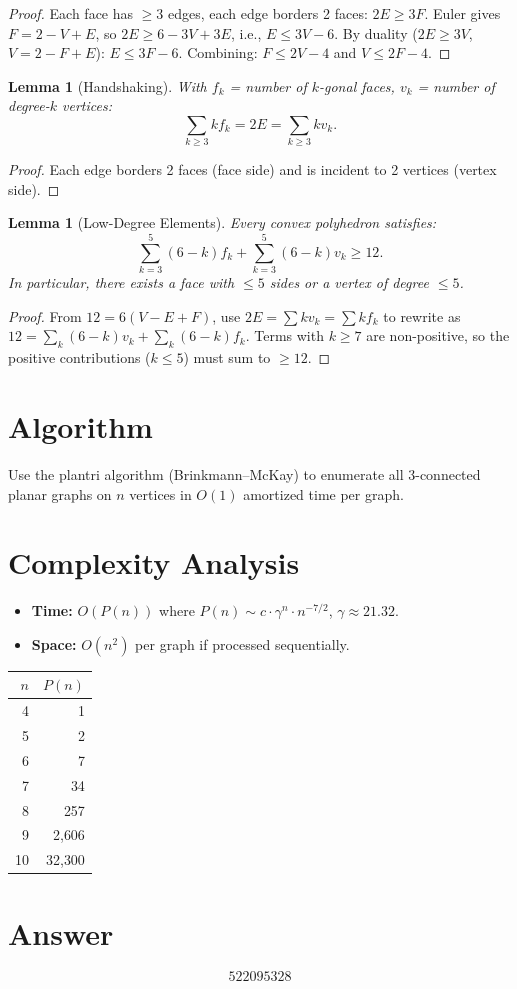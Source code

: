 \documentclass[11pt]{article}
\newtheorem{lemma}[theorem]{Lemma}
\begin{document}
\begin{proof}
Each face has $\ge 3$ edges, each edge borders 2 faces: $2E \ge 3F$. Euler gives $F = 2 - V + E$, so $2E \ge 6 - 3V + 3E$, i.e., $E \le 3V - 6$. By duality ($2E \ge 3V$, $V = 2 - F + E$): $E \le 3F - 6$. Combining: $F \le 2V-4$ and $V \le 2F-4$.
\end{proof}

\begin{lemma}[Handshaking]
With $f_k$ = number of $k$-gonal faces, $v_k$ = number of degree-$k$ vertices:
\[
\sum_{k \ge 3} k f_k = 2E = \sum_{k \ge 3} k v_k.
\]
\end{lemma}

\begin{proof}
Each edge borders 2 faces (face side) and is incident to 2 vertices (vertex side).
\end{proof}

\begin{lemma}[Low-Degree Elements]
Every convex polyhedron satisfies:
\[
\sum_{k=3}^{5}(6-k)f_k + \sum_{k=3}^{5}(6-k)v_k \ge 12.
\]
In particular, there exists a face with $\le 5$ sides or a vertex of degree $\le 5$.
\end{lemma}

\begin{proof}
From $12 = 6(V-E+F)$, use $2E = \sum k v_k = \sum k f_k$ to rewrite as $12 = \sum_k (6-k)v_k + \sum_k (6-k)f_k$. Terms with $k \ge 7$ are non-positive, so the positive contributions ($k \le 5$) must sum to $\ge 12$.
\end{proof}

\section{Algorithm}

Use the plantri algorithm (Brinkmann--McKay) to enumerate all 3-connected planar graphs on $n$ vertices in $O(1)$ amortized time per graph.

\section{Complexity Analysis}

\begin{itemize}
\item \textbf{Time:} $O(P(n))$ where $P(n) \sim c \cdot \gamma^n \cdot n^{-7/2}$, $\gamma \approx 21.32$.
\item \textbf{Space:} $O(n^2)$ per graph if processed sequentially.
\end{itemize}

\begin{center}
\begin{tabular}{r|r}
$n$ & $P(n)$ \\ \hline
4 & 1 \\ 5 & 2 \\ 6 & 7 \\ 7 & 34 \\ 8 & 257 \\ 9 & 2{,}606 \\ 10 & 32{,}300
\end{tabular}
\end{center}

\section{Answer}

\[
\boxed{522095328}
\]
\end{document}

